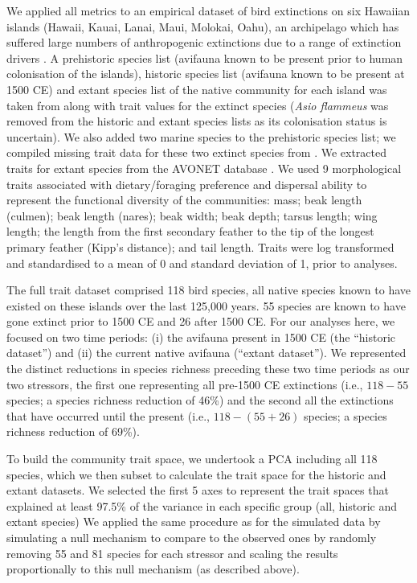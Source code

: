 \documentclass[12pt,letterpaper]{article}
\begin{document}
We applied all metrics to an empirical dataset of bird extinctions on six Hawaiian islands (Hawaii, Kauai, Lanai, Maui, Molokai, Oahu), an archipelago which has suffered large numbers of anthropogenic extinctions due to a range of extinction drivers \citep{Walther2022}.
A prehistoric species list (avifauna known to be present prior to human colonisation of the islands), historic species list (avifauna known to be present at 1500 CE) and extant species list of the native community for each island was taken from \cite{matthews2023global} along with trait values for the extinct species (\textit{Asio flammeus} was removed from the historic and extant species lists as its colonisation status is uncertain).
We also added two marine species to the prehistoric species list; we compiled missing trait data for these two extinct species from \cite{sayol2021loss}.
We extracted traits for extant species from the AVONET database \citep{tobias2022avonet}.
We used 9 morphological traits associated with dietary/foraging preference and dispersal ability \citep{pigot2020macroevolutionary,sheard2020ecological} to represent the functional diversity of the communities: mass; beak length (culmen); beak length (nares); beak width; beak depth; tarsus length; wing length; the length from the first secondary feather to the tip of the longest primary feather (Kipp's distance); and tail length.
Traits were log transformed and standardised to a mean of 0 and standard deviation of 1, prior to analyses.

The full trait dataset comprised 118 bird species, all native species known to have existed on these islands over the last 125,000 years.
55 species are known to have gone extinct prior to 1500 CE and 26 after 1500 CE.
For our analyses here, we focused on two time periods: (i) the avifauna present in 1500 CE (the ``historic dataset'') and (ii) the current native avifauna (``extant dataset'').
We represented the distinct reductions in species richness preceding these two time periods as our two stressors, the first one representing all pre-1500 CE extinctions (i.e., $118-55$ species; a species richness reduction of 46\%) and the second all the extinctions that have occurred until the present (i.e., $118-(55+26)$ species; a species richness reduction of 69\%).


To build the community trait space, we undertook a PCA including all 118 species, which we then subset to calculate the trait space for the historic and extant datasets.
We selected the first 5 axes to represent the trait spaces that explained at least 97.5\% of the variance in each specific group (all, historic and extant species)
We applied the same procedure as for the simulated data by simulating a null mechanism to compare to the observed ones by randomly removing 55 and 81 species for each stressor and scaling the results proportionally to this null mechanism (as described above).
\end{document}
